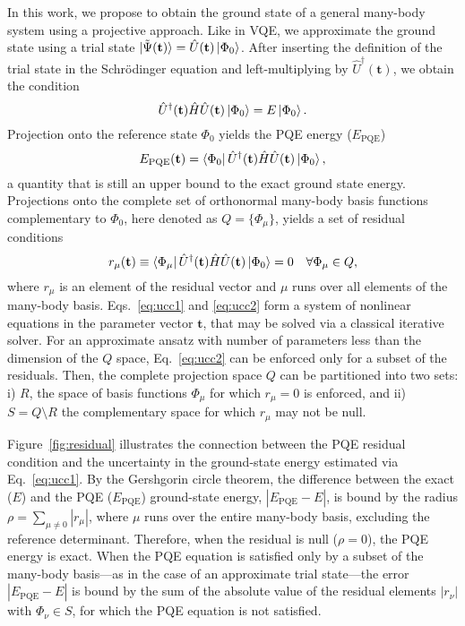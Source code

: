 \documentclass[aps,prx, reprint]{revtex4-2}
\begin{document}
In this work, we propose to obtain the ground state of a general many-body system using a projective approach.
Like in VQE, we approximate the ground state using a trial state $\ket{\tilde{\Psi}(\mathbf{t})}= \hat{U}(\mathbf{t}) \ket{\Phi_0}$.
After inserting the definition of the trial state in the Schr\"{o}dinger equation and left-multiplying by $\hat{U}^\dagger(\mathbf{t})$, we obtain the condition
\begin{equation}
\hat{U}^\dagger(\mathbf{t}) \hat{H} \hat{U}(\mathbf{t}) \ket{\Phi_0} = E \ket{\Phi_0}.
\end{equation}
Projection onto the reference state $\Phi_0$ yields the PQE energy ($E_\text{PQE}$)
\begin{equation}
E_\text{PQE}(\mathbf{t}) = \bra{\Phi_0} \hat{U}^\dagger(\mathbf{t}) \hat{H} \hat{U}(\mathbf{t}) \ket{\Phi_0},
\label{eq:ucc1}
\end{equation}
a quantity that is still an upper bound to the exact ground state energy.
Projections onto the complete set of orthonormal many-body basis functions complementary to $\Phi_0$, here denoted as $Q = \{\Phi_\mu \}$, yields a set of residual conditions
\begin{equation}
r_\mu(\mathbf{t}) \equiv \bra{\Phi_\mu} \hat{U}^\dagger(\mathbf{t}) \hat{H} \hat{U}(\mathbf{t}) \ket{\Phi_0} = 0 \quad \forall \Phi_\mu \in Q,
\label{eq:ucc2}
\end{equation}
where $r_\mu$ is an element of the residual vector and $\mu$ runs over all elements of the many-body basis.
Eqs.~\eqref{eq:ucc1} and \eqref{eq:ucc2} form a system of nonlinear equations in the parameter vector $\mathbf{t}$, that may be solved via a classical iterative solver.
For an approximate ansatz with number of parameters less than the dimension of the $Q$ space, Eq.~\eqref{eq:ucc2} can be enforced only for a subset of the residuals.
Then, the complete projection space $Q$ can be partitioned into two sets: i) $R$, the space of basis functions $\Phi_\mu$ for which $r_\mu = 0$ is enforced, and ii) $S = Q \setminus R$ the complementary space for which $r_\mu$ may not be null.


Figure~\ref{fig:residual} illustrates the connection between the PQE residual condition and the uncertainty in the ground-state energy estimated via Eq.~\eqref{eq:ucc1}.
By the Gershgorin circle theorem, the difference between the exact  ($E$) and the PQE ($E_{\mathrm{PQE}}$) ground-state energy, $|E_{\mathrm{PQE}} - E|$, is bound by the radius $\rho = \sum_{\mu \neq 0} |r_\mu|$, where $\mu$ runs over the entire many-body basis, excluding the reference determinant.
Therefore, when the residual is null ($\rho = 0$), the PQE energy is exact.
When the PQE equation is satisfied only by a subset of the many-body basis---as in the case of an approximate trial state---the error $|E_{\mathrm{PQE}} - E|$ is bound by the sum of the absolute value of the residual elements $|r_\nu|$ with $\Phi_\nu \in S$, for which the PQE equation is not satisfied.
\end{document}
